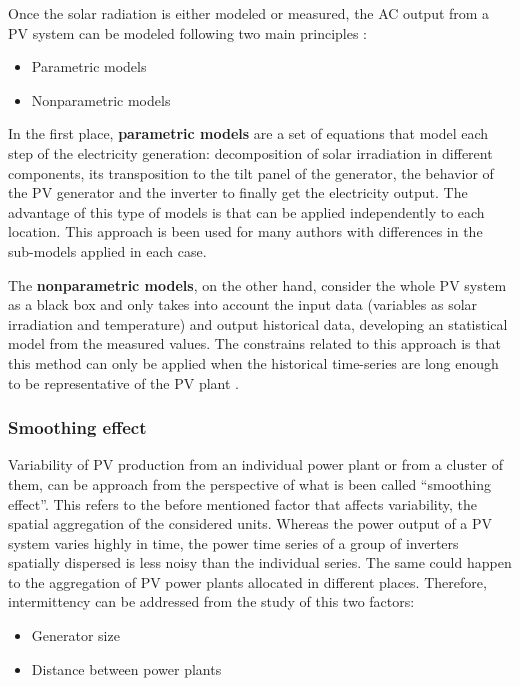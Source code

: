 Once the solar radiation is either modeled or measured, the AC output from a PV system can be modeled following two main principles \cite*{Almeida2015}:

\begin{itemize}
\item Parametric models
\item Nonparametric models
\end{itemize}

In the first place, \textbf{parametric models} are a set of equations that model each step of the electricity generation: decomposition of solar irradiation in different components, its transposition to the tilt panel of the generator, the behavior of the PV generator and the inverter to finally get the electricity output. The advantage of this type of models is that can be applied independently to each location. This approach is been used for many authors \cite*{Bofinger2006, Lorenz2008, Lorenz2011} with differences in the sub-models applied in each case.

The \textbf{nonparametric models}, on the other hand, consider the whole PV system as a black box and only takes into account the input data (variables as solar irradiation and temperature) and output historical data, developing an statistical model from the measured values. The constrains related to this approach is that this method can only be applied when the historical time-series are long enough to be representative of the PV plant \cite*{Bacher2009}. 

\subsubsection{Smoothing effect}

Variability of PV production from an individual power plant or from a cluster of them, can be approach from the perspective of what is been called ``smoothing effect''. This refers to the before mentioned factor that affects variability, the spatial aggregation of the considered units. Whereas the power output of a PV system varies highly in time, the power time series of a group of inverters spatially dispersed is less noisy than the individual series. The same could happen to the aggregation of PV power plants allocated in different places. Therefore, intermittency can be addressed from the study of this two factors:

\begin{itemize}
\item{Generator size}
\item{Distance between power plants}
\end{itemize}

